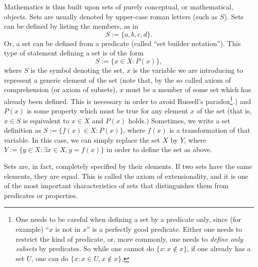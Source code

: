 \documentclass{article}
\begin{document}
Mathematics is thus built upon sets of purely conceptual, or mathematical, objects. Sets are usually denoted by upper-case roman letters (such as $S$). Sets can be defined by listing the members, as in
\[ S := \{ a, b, c, d\}. \]
Or, a set can be defined from a predicate (called ``set builder notation''). This type of statement defining a set is of the form
\[ S := \{ x \in X : P(x) \},\]
where $S$ is the symbol denoting the set, $x$ is the variable we are introducing to represent a generic element of the set (note that, by the so called axiom of comprehension (or axiom of subsets), $x$ must be a member of some set which has already been defined. This is necessary in order to avoid Russell's paradox\footnote{One needs to be careful when defining a set by a predicate only, since (for example) ``$x$ is not in $x$'' is a perfectly good predicate. Either one needs to restrict the kind of predicate, or, more commonly, one needs to \emph{define only subsets} by predicates. So while one cannot do $\{x \colon x \not\in x\}$, if one already has a set $U$, one can do $\{x: x \in U, x \not\in x\}$.}.) and $P(x)$ is some property which must be true for any element $x$ of the set (that is, $x\in S$ is equivalent to $x\in X$ and $P(x)$ holds.) Sometimes, we write a set definition as $S := \{ f(x) \in X : P(x) \}$, where $f(x)$ is a transformation of that variable. In this case, we can simply replace the set $X$ by $Y$, where $Y := \{ y \in X : \exists x\in X, y = f(x) \}$ in order to define the set as above.

Sets are, in fact, completely specified by their elements. If two sets have the same elements, they are equal. This is called the axiom of extensionality, and it is one of the most important characteristics of sets that distinguishes them from predicates or properties.


\end{document}
